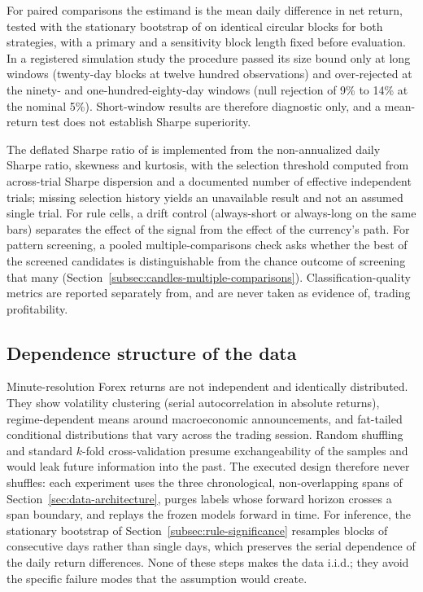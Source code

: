 For paired comparisons the estimand is the mean daily difference in net return, tested with the stationary bootstrap of  on identical circular blocks for both strategies, with a primary and a sensitivity block length fixed before evaluation. In a registered simulation study the procedure passed its size bound only at long windows (twenty-day blocks at twelve hundred observations) and over-rejected at the ninety- and one-hundred-eighty-day windows (null rejection of 9\% to 14\% at the nominal 5\%). Short-window results are therefore diagnostic only, and a mean-return test does not establish Sharpe superiority.

The deflated Sharpe ratio of  is implemented from the non-annualized daily Sharpe ratio, skewness and kurtosis, with the selection threshold computed from across-trial Sharpe dispersion and a documented number of effective independent trials; missing selection history yields an unavailable result and not an assumed single trial. For rule cells, a drift control (always-short or always-long on the same bars) separates the effect of the signal from the effect of the currency's path. For pattern screening, a pooled multiple-comparisons check asks whether the best of the screened candidates is distinguishable from the chance outcome of screening that many (Section~\ref{subsec:candles-multiple-comparisons}). Classification-quality metrics are reported separately from, and are never taken as evidence of, trading profitability.

\subsection{Dependence structure of the data} \label{subsec:iid}

Minute-resolution Forex returns are not independent and identically distributed. They show volatility clustering (serial autocorrelation in absolute returns), regime-dependent means around macroeconomic announcements, and fat-tailed conditional distributions that vary across the trading session. Random shuffling and standard $k$-fold cross-validation presume exchangeability of the samples and would leak future information into the past. The executed design therefore never shuffles: each experiment uses the three chronological, non-overlapping spans of Section~\ref{sec:data-architecture}, purges labels whose forward horizon crosses a span boundary, and replays the frozen models forward in time. For inference, the stationary bootstrap of Section~\ref{subsec:rule-significance} resamples blocks of consecutive days rather than single days, which preserves the serial dependence of the daily return differences. None of these steps makes the data i.i.d.; they avoid the specific failure modes that the assumption would create.

